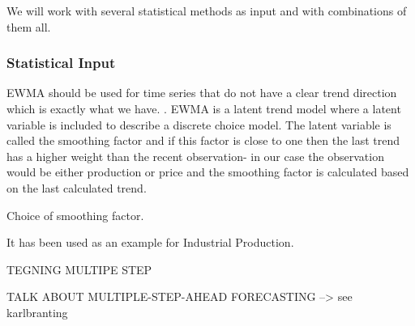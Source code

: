 We will work with several statistical methods as input and with combinations of them all. 

\subsubsection{Statistical Input}

EWMA should be used for time series that do not have a clear trend direction\cite[Chapter~7.3.2]{econometrics} which is exactly what we have. . EWMA is a latent trend model where a latent variable is included to describe a discrete choice model. The latent variable is called the smoothing factor and if this factor is close to one then the last trend has a higher weight than the recent observation- in our case the observation would be either production or price and the smoothing factor is calculated based on the last calculated trend.

Choice of smoothing factor.

It has been used as an example for Industrial Production. 

TEGNING MULTIPE STEP

TALK ABOUT MULTIPLE-STEP-AHEAD FORECASTING --> see karlbranting
